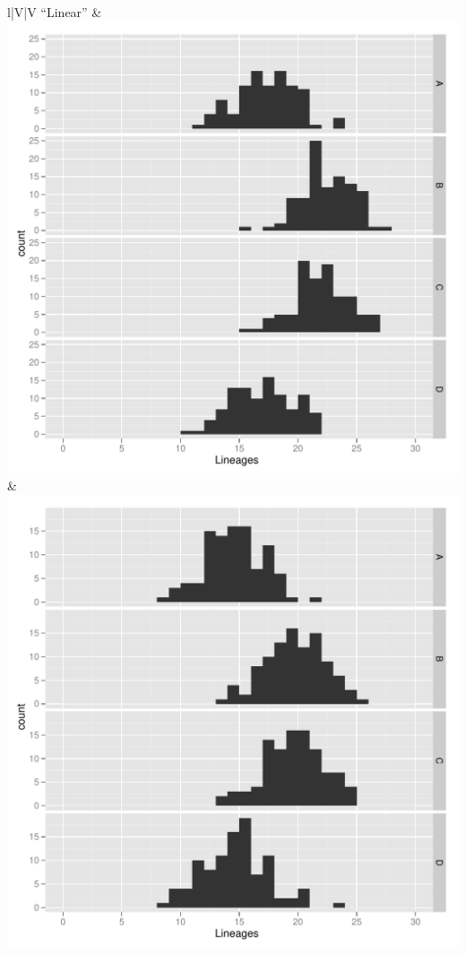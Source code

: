 \documentclass[11pt,t]{beamer}
\begin{document}
\begin{frame}
\begin{center}
\begin{tabular}{l|V|V}
\hline
``Linear''	& \includegraphics[scale=0.15]{results-lineages-linear-d0.pdf}		  & \includegraphics[scale=0.15]{results-lineages-linear-d1.pdf} 		\\
\hline	
\end{tabular}
\end{center}
\end{frame}
\end{document}
